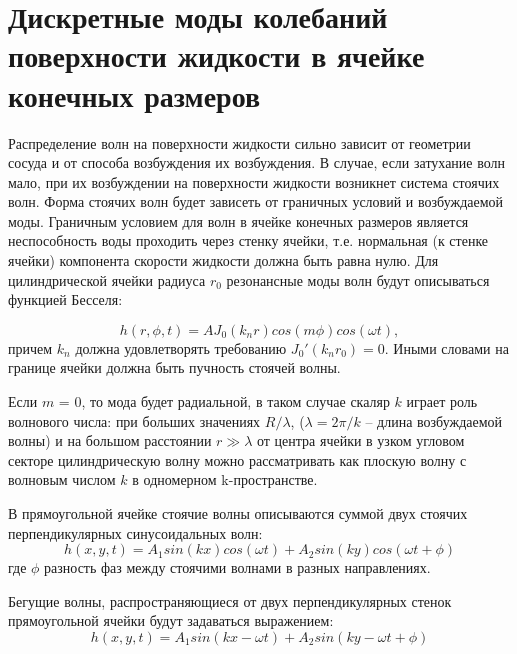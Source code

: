 \section{Дискретные моды колебаний поверхности жидкости  в ячейке конечных размеров} %

Распределение волн на поверхности жидкости сильно зависит от геометрии сосуда и от способа возбуждения их возбуждения.
В случае, если затухание волн мало, при их возбуждении на поверхности жидкости возникнет система стоячих волн. Форма стоячих волн будет зависеть от граничных условий и возбуждаемой моды. Граничным условием для волн в ячейке конечных размеров  является неспособность воды проходить через стенку ячейки, т.е. нормальная (к стенке ячейки) компонента скорости жидкости должна быть равна нулю. Для цилиндрической ячейки радиуса $r_0$ резонансные моды волн будут описываться функцией Бесселя:

\begin{equation}
 \label{eq:Bessel}
h(r, \phi, t) = A J_0(k_nr) cos(m\phi) cos(\omega t),
\end{equation}
причем $k_n$ должна удовлетворять требованию ${J_0}'(k_nr_0) = 0$. Иными словами на границе ячейки должна быть пучность стоячей волны.

Если $m$ = 0, то мода будет радиальной, в таком случае скаляр $k$ играет роль волнового числа: при больших значениях $R/\lambda$, ($\lambda = 2\pi/k$ – длина возбуждаемой волны) и на большом расстоянии $r \gg \lambda$ от центра ячейки в узком угловом секторе цилиндрическую волну можно рассматривать как плоскую волну с волновым числом $k$ в одномерном k-пространстве.

В прямоугольной ячейке стоячие волны описываются суммой двух стоячих перпендикулярных синусоидальных волн:
\begin{equation}
\label{eq:waveStand}
h(x, y, t) = A_1 sin(kx)cos(\omega t)+A_2 sin(ky)cos(\omega t+ \phi)
\end{equation}
где $\phi$ разность фаз между стоячими волнами в разных направлениях.

Бегущие волны, распространяющиеся от двух перпендикулярных стенок прямоугольной ячейки будут задаваться выражением:
\begin{equation}
\label{eq:waveRun}
h(x, y, t) = A_1 sin(kx-\omega t)+A_2 sin(ky-\omega t+ \phi)
\end{equation}



